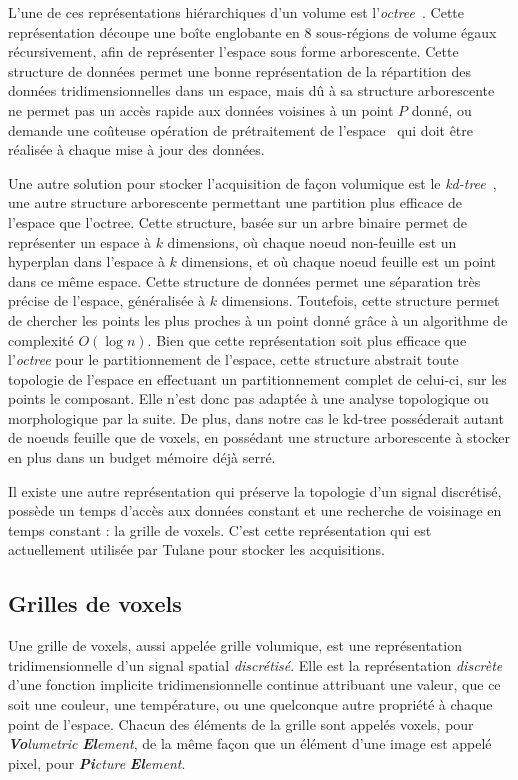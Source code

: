 {{		L'une de ces représentations hiérarchiques d'un volume est l'\textit{octree}~\cite{cite_octree}. Cette représentation découpe une boîte englobante en 8 sous-régions de volume égaux récursivement, afin de représenter l'espace sous forme arborescente. Cette structure de données permet une bonne représentation de la répartition des données tridimensionnelles dans un espace, mais dû à sa structure arborescente ne permet pas un accès rapide aux données voisines à un point $P$ donné, ou demande une coûteuse opération de prétraitement de l'espace~\cite{cite_octree_neighbor_search} qui doit être réalisée à chaque mise à jour des données.

		Une autre solution pour stocker l'acquisition de façon volumique est le \textit{kd-tree}~\cite{cite_kd_tree}, une autre structure arborescente permettant une partition plus efficace de l'espace que l'octree. Cette structure, basée sur un arbre binaire permet de représenter un espace à $k$ dimensions, où chaque noeud non-feuille est un hyperplan dans l'espace à $k$ dimensions, et où chaque noeud feuille est un point dans ce même espace. Cette structure de données permet une séparation très précise de l'espace, généralisée à $k$ dimensions. Toutefois, cette structure permet de chercher les points les plus proches à un point donné grâce à un algorithme de complexité $O(\log{n})$. Bien que cette représentation soit plus efficace que l'\textit{octree} pour le partitionnement de l'espace, cette structure abstrait toute topologie de l'espace en effectuant un partitionnement complet de celui-ci, sur les points le composant. Elle n'est donc pas adaptée à une analyse topologique ou morphologique par la suite. De plus, dans notre cas le kd-tree posséderait autant de noeuds feuille que de voxels, en possédant une structure arborescente à stocker en plus dans un budget mémoire déjà serré.

		Il existe une autre représentation qui préserve la topologie d'un signal discrétisé, possède un temps d'accès aux données constant et une recherche de voisinage en temps constant : la grille de voxels. C'est cette représentation qui est actuellement utilisée par Tulane pour stocker les acquisitions.

		\subsection{Grilles de voxels}
		{
			Une grille de voxels, aussi appelée grille volumique, est une représentation tridimensionnelle d'un signal spatial \emph{discrétisé}. Elle est la représentation \emph{discrète} d'une fonction implicite tridimensionnelle continue attribuant une valeur, que ce soit une couleur, une température, ou une quelconque autre propriété à chaque point de l'espace. Chacun des éléments de la grille sont appelés voxels, pour \textit{\textbf{Vo}}\textit{lumetric} \textit{\textbf{El}}\textit{ement}, de la même façon que un élément d'une image est appelé pixel, pour \textit{\textbf{Pi}}\textit{cture} \textbf{\textit{El}}\textit{ement}.

}}}
